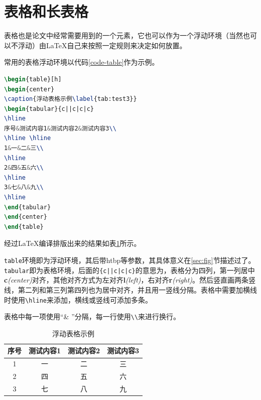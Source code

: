 \section{表格和长表格}
表格也是论文中经常需要用到的一个元素，它也可以作为一个浮动环境（当然也可以不浮动）由\LaTeX{}自己来按照一定规则来决定如何放置。\par
常用的表格浮动环境以代码\ref{code-table}作为示例。\par
\begin{lstlisting}[caption={表格浮动环境},label={code-table},language={LaTeX}]
\begin{table}[h]
\begin{center}
\caption{浮动表格示例\label{tab:test3}}
\begin{tabular}{c||c|c|c}
\hline
序号&测试内容1&测试内容2&测试内容3\\
\hline \hline
1&一&二&三\\
\hline
2&四&五&六\\
\hline
3&七&八&九\\
\hline
\end{tabular}
\end{center}
\end{table}
\end{lstlisting}
经过\LaTeX{}编译排版出来的结果如表\ref{tab-test3}所示。\par
\texttt{table}环境即为浮动环境，其后带htbp等参数，其具体意义在\ref{sec:fig}节描述过了。\texttt{tabular}即为表格环境，后面的\texttt{\{c||c|c|c\}}的意思为，表格分为四列，第一列居中{\bf c}\textit{(center)}对齐，其他对齐方式为左对齐{\bf l}\textit{(left)}，右对齐{\bf r}\textit{(right)}。然后竖直画两条竖线，第二列和第三列第四列也为居中对齐，并且用一竖线分隔。表格中需要加横线时使用\texttt{\textbackslash hline}来添加，横线或竖线可添加多条。\par
表格中每一项使用“\& ”分隔，每一行使用\texttt{\textbackslash\textbackslash}来进行换行。\par
\begin{table}[ht]
\begin{center}
\caption{浮动表格示例\label{tab-test3}}
\begin{tabular}{c||c|c|c}
\hline
序号&测试内容1&测试内容2&测试内容3\\
\hline \hline
1&一&二&三\\
\hline
2&四&五&六\\
\hline
3&七&八&九\\
\hline
\end{tabular}
\end{center}
\end{table}

